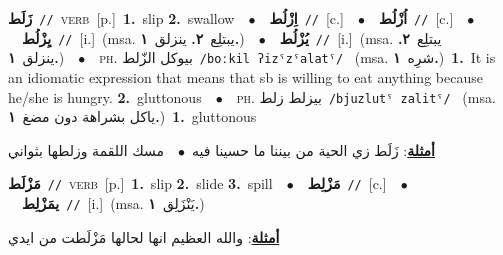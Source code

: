 \documentclass[10pt,a4paper,twoside]{article} %
\begin{document}
\begin{multicols}{2}
{\setlength\topsep{0pt}\textbf{\foreignlanguage{arabic}{زَلَط}}\ {\color{gray}\texttt{//}\color{black}}\ \textsc{verb}\ [p.]\ \textbf{1.}~slip  \textbf{2.}~swallow\ \ $\bullet$\ \ \setlength\topsep{0pt}\textbf{\foreignlanguage{arabic}{اِزْلُط}}\ {\color{gray}\texttt{//}\color{black}}\ [c.]\ \ $\bullet$\ \ \setlength\topsep{0pt}\textbf{\foreignlanguage{arabic}{اُزْلُط}}\ {\color{gray}\texttt{//}\color{black}}\ [c.]\ \ $\bullet$\ \ \setlength\topsep{0pt}\textbf{\foreignlanguage{arabic}{يِزْلُط}}\ {\color{gray}\texttt{//}\color{black}}\ [i.]\ \color{gray}(msa. \foreignlanguage{arabic}{يبتلِع}~\foreignlanguage{arabic}{\textbf{٢.}}  \foreignlanguage{arabic}{ينزلق}~\foreignlanguage{arabic}{\textbf{١.}})\color{black}\ \ $\bullet$\ \ \setlength\topsep{0pt}\textbf{\foreignlanguage{arabic}{يُزْلُط}}\ {\color{gray}\texttt{//}\color{black}}\ [i.]\ \color{gray}(msa. \foreignlanguage{arabic}{يبتلِع}~\foreignlanguage{arabic}{\textbf{٢.}}  \foreignlanguage{arabic}{ينزلق}~\foreignlanguage{arabic}{\textbf{١.}})\color{black}\ \ $\bullet$\ \ \textsc{ph.} \color{gray} \foreignlanguage{arabic}{بيوكل الزّلط}\color{black}\ {\color{gray}\texttt{/{\sffamily boːkil ʔizˤzˤalatˤ}/}\color{black}}\ \color{gray} (msa. \foreignlanguage{arabic}{شرِه}~\foreignlanguage{arabic}{\textbf{١.}})\color{black}\ \textbf{1.}~It is an idiomatic expression that means that sb is willing to eat anything because he/she is hungry.  \textbf{2.}~gluttonous\ \ $\bullet$\ \ \textsc{ph.} \color{gray} \foreignlanguage{arabic}{بيزلط زلط}\color{black}\ {\color{gray}\texttt{/{\sffamily bjuzlutˤ zalitˤ}/}\color{black}}\ \color{gray} (msa. \foreignlanguage{arabic}{ياكل بشراهة دون مضغ}~\foreignlanguage{arabic}{\textbf{١.}})\color{black}\ \textbf{1.}~gluttonous\  \begin{flushright}\color{gray}\foreignlanguage{arabic}{\textbf{\underline{\foreignlanguage{arabic}{أمثلة}}}: زَلَط زي الحية من بيننا ما حسينا فيه\ $\bullet$\ \  مسك اللقمة وزلطها بثواني}\end{flushright}\color{black}} \vspace{2mm}

{\setlength\topsep{0pt}\textbf{\foreignlanguage{arabic}{مَزْلَط}}\ {\color{gray}\texttt{//}\color{black}}\ \textsc{verb}\ [p.]\ \textbf{1.}~slip  \textbf{2.}~slide  \textbf{3.}~spill\ \ $\bullet$\ \ \setlength\topsep{0pt}\textbf{\foreignlanguage{arabic}{مَزْلِط}}\ {\color{gray}\texttt{//}\color{black}}\ [c.]\ \ $\bullet$\ \ \setlength\topsep{0pt}\textbf{\foreignlanguage{arabic}{يمَزْلِط}}\ {\color{gray}\texttt{//}\color{black}}\ [i.]\ \color{gray}(msa. \foreignlanguage{arabic}{يَنْزَلِق}~\foreignlanguage{arabic}{\textbf{١.}})\color{black}\  \begin{flushright}\color{gray}\foreignlanguage{arabic}{\textbf{\underline{\foreignlanguage{arabic}{أمثلة}}}: والله العظيم انها لحالها مَزْلَطت من ايدي}\end{flushright}\color{black}} \vspace{2mm}


\end{multicols}
\end{document}
